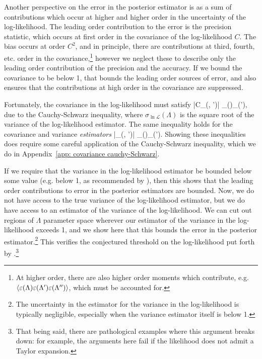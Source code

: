 \documentclass[%
 reprint,
 amsmath,amssymb,
 aps,nofootinbib,nobibnotes,onecolumn,prd
]{revtex4-2}
\begin{document}
Another perspective on the error in the posterior estimator is as a sum of contributions which occur at higher and higher order in the uncertainty of the log-likelihood. The leading order contribution to the error is the precision statistic, which occurs at first order in the covariance of the log-likelihood $C$. The bias occurs at order $C^2$, and in principle, there are contributions at third, fourth, etc. order in the covariance,\footnote{At higher order, there are also higher order moments which contribute, e.g. $\langle \varepsilon(\Lambda)\varepsilon(\Lambda')\varepsilon(\Lambda'')\rangle$, which must be accounted for.} 
however we neglect these to describe only the leading order contribution of the precision and the accuracy. If we bound the covariance to be below 1, that bounds the leading order sources of error, and also ensures that the contributions at high order in the covariance are suppressed.

Fortunately, the covariance in the log-likelihood must satisfy
\beq
|C_{\ln{}}(\Lambda, \Lambda')| \le {} \equiv \sigma_{\ln{}}(\Lambda)\sigma_{\ln{}}(\Lambda'),
\label{eq: covariance Schwarz inequality}
\eeq
due to the Cauchy-Schwarz inequality, where $\sigma_{\ln\mathcal{L}}(\Lambda)$ is the square root of the variance of the log-likelihood estimator. The same inequality holds for the covariance and variance \textit{estimators}
\beq
|_{\ln{}}(\Lambda, \Lambda')| \le \hat{\sigma}_{\ln{}}(\Lambda)\hat{\sigma}_{\ln{}}(\Lambda').
\label{eq: covariance Schwarz inequality estimator}
\eeq
Showing these inequalities does require some careful application of the Cauchy-Schwarz inequality, which we do in Appendix~\ref{app: covariance cauchy-Schwarz}.

If we require that the variance in the log-likelihood estimator be bounded below some value (e.g. below 1, as recommended by \citet{Talbot:2023pex}), then this shows that the leading order contributions to error in the posterior estimators are bounded. Now, we do not have access to the true variance of the log-likelihood estimator, but we do have access to an estimator of the variance of the log-likelihood. We can cut out regions of $\Lambda$ parameter space wherever our estimator of the variance in the log-likelihood exceeds 1, and we show here that this bounds the error in the posterior estimator.\footnote{The uncertainty in the estimator for the variance in the log-likelihood is typically negligible, especially when the variance estimator itself is below 1.} This verifies the conjectured threshold on the log-likelihood put forth by \citet{Talbot:2023pex}.\footnote{That being said, there are pathological examples where this argument breaks down: for example, the arguments here fail if the likelihood does not admit a Taylor expansion.}
\end{document}
